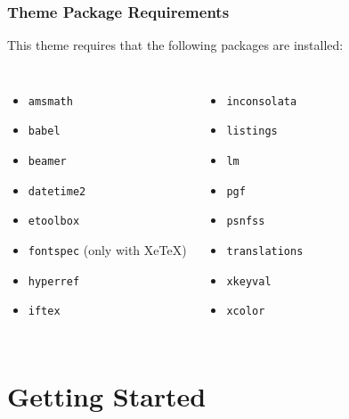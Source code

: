 \documentclass[utf8,aspectratio=169,ngerman,english]{beamer}
\begin{document}
\begin{frame}
\frametitle{Theme Package Requirements}

This theme requires that the following packages are installed:
\begin{columns}[onlytextwidth]
\begin{itemize}
\item \texttt{amsmath}
\item \texttt{babel}
\item \texttt{beamer}
\item \texttt{datetime2}
\item \texttt{etoolbox}
\item \texttt{fontspec} (only with XeTeX)
\item \texttt{hyperref}
\item \texttt{iftex}
\end{itemize}

\begin{itemize}
\item \texttt{inconsolata}
\item \texttt{listings}
\item \texttt{lm}
\item \texttt{pgf}
\item \texttt{psnfss}
\item \texttt{translations}
\item \texttt{xkeyval}
\item \texttt{xcolor}
\end{itemize}
\end{columns}
\end{frame}


\section{Getting Started}
\end{document}
